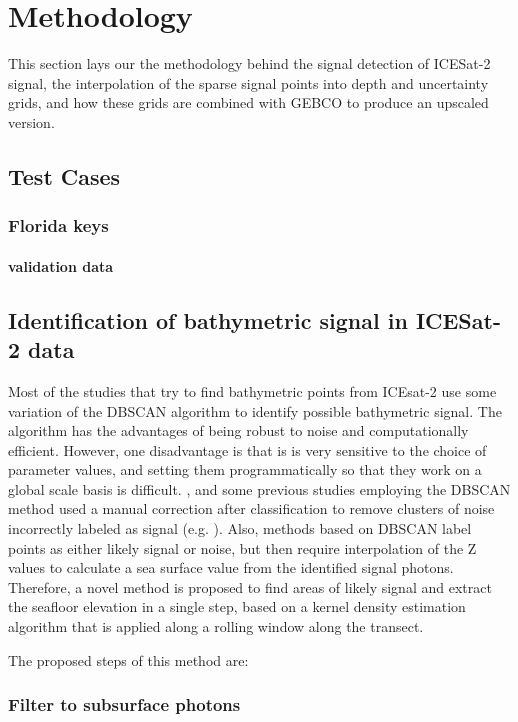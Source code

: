 \chapter{Methodology}
This section lays our the methodology behind the signal detection of ICESat-2 signal, the interpolation of the sparse signal points into depth and uncertainty grids, and how these grids are combined with GEBCO to produce an upscaled version.
\section{Test Cases}
\subsection{Florida keys}
\subsubsection{validation data}


\section{Identification of bathymetric signal in ICESat-2 data} \label{sec:kdesignalfinding}
Most of the studies that try to find bathymetric points from ICEsat-2 use some variation of the DBSCAN algorithm to identify possible bathymetric signal. The algorithm has the advantages of being robust to noise \cite{} and computationally efficient. However, one disadvantage is that is is very sensitive to the choice of parameter values, and setting them programmatically so that they work on a global scale basis is difficult. , and some previous studies employing the DBSCAN method used a manual correction after classification to remove clusters of noise incorrectly labeled as signal (e.g. \cite{Ma2020}). Also, methods based on DBSCAN label points as either likely signal or noise, but then require interpolation of the Z values to calculate a sea surface value from the identified signal photons. Therefore, a novel  method is proposed to find areas of likely signal and extract the seafloor elevation in a single step, based on a kernel density estimation algorithm that is applied along a rolling window along the transect.

The proposed steps of this method are:
\subsection{Filter to subsurface photons}

